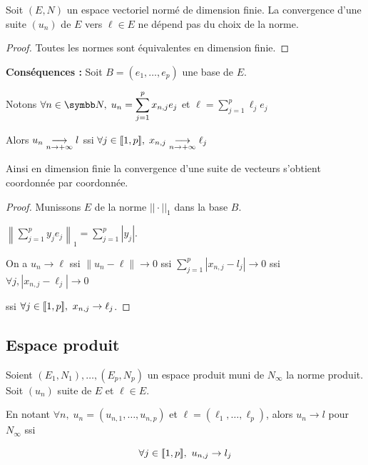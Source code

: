 \begin{theoreme}{}{}
    Soit $(E, N)$ un espace vectoriel normé de dimension finie. La convergence d'une suite $(u_n)$ de $E$
    vers $\ell \in E$ ne dépend pas du choix de la norme. 
\end{theoreme}

\begin{proof}
    Toutes les normes sont équivalentes en dimension finie. 
\end{proof}

\textbf{Conséquences :}
Soit $B = (e_1, \dots, e_p)$ une base de $E$.

Notons $\displaystyle  \forall n \in \N, \; u_n = \sum_{j = 1}^{p} x_{n, j} e_j$
et $\displaystyle \ell = \sum_{j = 1}^{p} \ell_j e_j$

Alors $u_n \underset{n \to + \infty}{\longrightarrow} l$ ssi $\forall j \in [\![1, p]\!], \; x_{n, j} \underset{n \to + \infty}{\longrightarrow} \ell_j$

Ainsi en dimension finie la convergence d'une suite de vecteurs s'obtient coordonnée par coordonnée. 

\begin{proof}
    Munissons $E$ de la norme $||\cdot||_1$ dans la base $B$. 

    $\displaystyle \left\|\sum_{j =  1}^{p} y_je_j\right\|_1 = \sum_{j = 1}^{p} |y_j|$.

    On a $u_n \to \ell$ ssi $\| u_n - \ell\| \to 0$ ssi 
    $\displaystyle \sum_{j = 1}^{p }|x_{n, j} - l_j| \to 0$ ssi 
    $\forall j, |x_{n, j} - \ell_j| \to 0$

    ssi $\forall j \in [\![1, p]\!],~x_{n, j} \to \ell_j$. 
\end{proof}

\subsection{Espace produit}

\begin{definition}{}{}
    Soient $(E_1, N_1), \dots, (E_p, N_p)$ un espace produit muni de $N_\infty$ la norme produit. 
    Soit $(u_n)$ suite de $E$ et $\ell \in E$.

    En notant $\forall n, \; u_n = (u_{n, 1}, \dots, u_{n, p})$ et $\ell = (\ell_1, \dots, \ell_p)$, 
    alors $u_n \to l$ pour $N_\infty$ ssi

    \[\forall j \in [\![1, p]\!],~u_{n, j} \to l_j\]
\end{definition}

